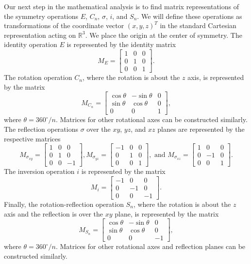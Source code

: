 \documentclass{article}
\begin{document}
    Our next step in the mathematical analysis is to find matrix representations of the symmetry operations $E$, $C_n$, $\sigma$, $i$, and $S_n$. We will define these operations as transformations of the coordinate vector $(x,y,z)^T$ in the standard Cartesian representation acting on $\mathbb{R}^3$. We place the origin at the center of symmetry. The identity operation $E$ is represented by the identity matrix \[M_E=\begin{bmatrix}1&0&0\\0&1&0\\0&0&1\end{bmatrix}.\] The rotation operation $C_n$, where the rotation is about the $z$ axis, is represented by the matrix \[M_{C_n}=\begin{bmatrix}\cos\theta&-\sin\theta&0\\\sin\theta&\cos\theta&0\\0&0&1\end{bmatrix},\] where $\theta=360^\circ/n$. Matrices for other rotational axes can be constructed similarly. The reflection operations $\sigma$ over the $xy$, $yz$, and $xz$ planes are represented by the respective matrices \[M_{\sigma_{xy}}=\begin{bmatrix}1&0&0\\0&1&0\\0&0&-1\end{bmatrix}, M_{\sigma_{yz}}=\begin{bmatrix}-1&0&0\\0&1&0\\0&0&1\end{bmatrix}, \text{ and }M_{\sigma_{xz}}=\begin{bmatrix}1&0&0\\0&-1&0\\0&0&1\end{bmatrix}.\] The inversion operation $i$ is represented by the matrix \[M_i=\begin{bmatrix}-1&0&0\\0&-1&0\\0&0&-1\end{bmatrix}.\] Finally, the rotation-reflection operation $S_n$, where the rotation is about the $z$ axis and the reflection is over the $xy$ plane, is represented by the matrix \[M_{S_n}=\begin{bmatrix}\cos\theta&-\sin\theta&0\\\sin\theta&\cos\theta&0\\0&0&-1\end{bmatrix},\] where $\theta=360^\circ/n$. Matrices for other rotational axes and reflection planes can be constructed similarly.
\end{document}
